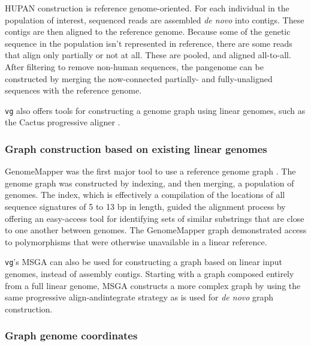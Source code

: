 HUPAN construction is reference genome-oriented.
For each individual in the population of interest, sequenced reads are assembled \textit{de novo} into contigs.
These contigs are then aligned to the reference genome.
Because some of the genetic sequence in the population isn't represented in reference, there are some reads that align only partially or not at all.
These are pooled, and aligned all-to-all.
After filtering to remove non-human sequences, the pangenome can be constructed by merging the now-connected partially- and fully-unaligned sequences with the reference genome.

\texttt{vg} also offers tools for constructing a genome graph using linear genomes, such as the Cactus progressive aligner \cite{Garrison_2018}.


\subsubsection{Graph construction based on existing linear genomes}

GenomeMapper was the first major tool to use a reference genome graph \cite{Schneeberger_2009}.
The genome graph was constructed by indexing, and then merging, a population of genomes. 
The index, which is effectively a compilation of the locations of all sequence signatures of 5 to 13 bp in length, guided the alignment process by offering an easy-access tool for identifying sets of similar substrings that are close to one another between genomes. 
The GenomeMapper graph demonstrated access to polymorphisms that were otherwise unavailable in a linear reference.

\texttt{vg}'s MSGA can also be used for constructing a graph based on linear input genomes, instead of assembly contigs.
Starting with a graph composed entirely from a full linear genome, MSGA constructs a more complex graph by using the same progressive align-andintegrate strategy as is used for \textit{de novo} graph construction. 

\subsubsection{Graph genome coordinates}

